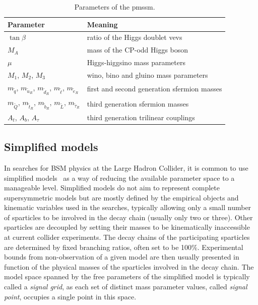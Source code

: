 \begin{table}
	\centering
	\setlength\heavyrulewidth{0.2ex}
	\small
	\caption{Parameters of the \gls{pmssm}.}
	\begin{tabular} {l l}
	\toprule
		Parameter & Meaning \\ 
	\midrule
	$\tan{\beta}$ & ratio of the Higgs doublet \glspl{vev} \\
	$M_A$ & mass of the CP-odd Higgs boson \\
	$\mu$ & Higgs-higgsino mass parameters \\
	$M_1$, $M_2$, $M_3$ & wino, bino and gluino mass parameters \\
	$m_{\tilde{q}}$, $m_{\tilde{u}_R}$, $m_{\tilde{d}_R}$, $m_{\tilde{\ell}}$, $m_{\tilde{e}_R}$ & first and second generation sfermion masses \\
	$m_{\tilde{Q}}$, $m_{\tilde{t}_R}$, $m_{\tilde{b}_R}$, $m_{\tilde{L}}$, $m_{\tilde{\tau}_R}$ & third generation sfermion masses \\
	$A_t$, $A_b$, $A_\tau$ & third generation trilinear couplings \\
	\bottomrule					
	\end{tabular}\vspace{3mm}
	\label{tab:parameters_pmssm}   
\end{table}


\subsection{Simplified models}\label{sec:simplified_models}

In searches for BSM physics at the Large Hadron Collider, it is common to use simplified models~\cite{SimplifiedModels1:2008ag,SimplifiedModels2:2011wf,Alves:2011sq} as a way of reducing the available parameter space to a manageable level. Simplified models do not aim to represent complete supersymmetric models but are mostly defined by the empirical objects and kinematic variables used in the searches, typically allowing only a small number of sparticles to be involved in the decay chain (usually only two or three). Other sparticles are decoupled by setting their masses to be kinematically inaccessible at current collider experiments. The decay chains of the participating sparticles are determined by fixed branching ratios, often set to be 100\%. Experimental bounds from non-observation of a given model are then usually presented in function of the physical masses of the sparticles involved in the decay chain. The model space spanned by the free parameters of the simplified model is typically called a \textit{signal grid}, as each set of distinct mass parameter values, called \textit{signal point}, occupies a single point in this space.

